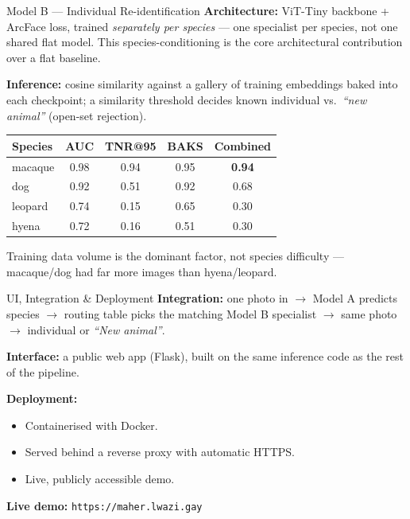 \documentclass{beamer}
\begin{document}
\begin{frame}{Model B --- Individual Re-identification}
  \textbf{Architecture:} ViT-Tiny backbone + ArcFace loss, trained
  \emph{separately per species} --- one specialist per species, not one
  shared flat model. This species-conditioning is the core architectural
  contribution over a flat baseline.

  \vspace{0.3em}
  \textbf{Inference:} cosine similarity against a gallery of training
  embeddings baked into each checkpoint; a similarity threshold decides
  known individual vs.\ \emph{``new animal''} (open-set rejection).

  \vspace{0.5em}
  \begin{table}
    \centering \small
    \begin{tabular}{lcccc}
      \toprule
      Species & AUC & TNR@95 & BAKS & Combined \\
      \midrule
      macaque & 0.98 & 0.94 & 0.95 & \textbf{0.94} \\
      dog     & 0.92 & 0.51 & 0.92 & 0.68 \\
      leopard & 0.74 & 0.15 & 0.65 & 0.30 \\
      hyena   & 0.72 & 0.16 & 0.51 & 0.30 \\
      \bottomrule
    \end{tabular}
  \end{table}
  \small Training data volume is the dominant factor, not species
  difficulty --- macaque/dog had far more images than hyena/leopard.
\end{frame}

\begin{frame}{UI, Integration \& Deployment}
  \textbf{Integration:} one photo in $\rightarrow$ Model A predicts species
  $\rightarrow$ routing table picks the matching Model B specialist
  $\rightarrow$ same photo $\rightarrow$ individual or \emph{``New animal''}.

  \vspace{0.5em}
  \textbf{Interface:} a public web app (Flask), built on the same
  inference code as the rest of the pipeline.

  \vspace{0.5em}
  \textbf{Deployment:}
  \begin{itemize}
    \item Containerised with Docker.
    \item Served behind a reverse proxy with automatic HTTPS.
    \item Live, publicly accessible demo.
  \end{itemize}

  \vspace{1em}
  \centering \large \textbf{Live demo:} \texttt{\small https://maher.lwazi.gay}
\end{frame}
\end{document}
